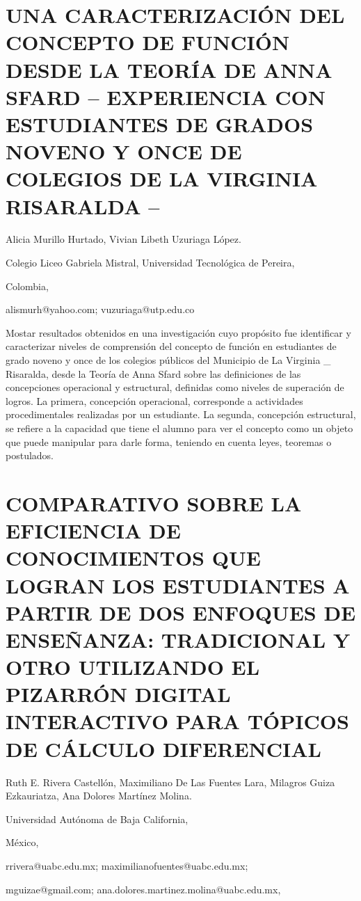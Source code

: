 \section{UNA CARACTERIZACIÓN DEL CONCEPTO DE FUNCIÓN DESDE LA TEORÍA DE ANNA
SFARD – EXPERIENCIA CON ESTUDIANTES DE GRADOS NOVENO Y ONCE DE COLEGIOS
DE LA VIRGINIA RISARALDA –}

\begin{datos}

Alicia Murillo Hurtado, Vivian Libeth Uzuriaga López.

Colegio Liceo Gabriela Mistral, Universidad Tecnológica de Pereira,

Colombia,

alismurh@yahoo.com; vuzuriaga@utp.edu.co 

\end{datos}

Mostar resultados obtenidos en una investigación cuyo propósito fue
identificar y caracterizar niveles de comprensión del concepto de
función en estudiantes de grado noveno y once de los colegios públicos
del Municipio de La Virginia \_ Risaralda, desde la Teoría de Anna
Sfard sobre las definiciones de las concepciones operacional y estructural,
definidas como niveles de superación de logros. La primera, concepción
operacional, corresponde a actividades procedimentales realizadas
por un estudiante. La segunda, concepción estructural, se refiere
a la capacidad que tiene el alumno para ver el concepto como un objeto
que puede manipular para darle forma, teniendo en cuenta leyes, teoremas
o postulados.


\section{COMPARATIVO SOBRE LA EFICIENCIA DE CONOCIMIENTOS QUE LOGRAN LOS ESTUDIANTES
A PARTIR DE DOS ENFOQUES DE ENSEÑANZA: TRADICIONAL Y OTRO UTILIZANDO
EL PIZARRÓN DIGITAL INTERACTIVO PARA TÓPICOS DE CÁLCULO DIFERENCIAL}

\begin{datos}

Ruth E. Rivera Castellón, Maximiliano De Las Fuentes Lara, Milagros
Guiza Ezkauriatza, Ana Dolores Martínez Molina.

Universidad Autónoma de Baja California,

México,

rrivera@uabc.edu.mx; maximilianofuentes@uabc.edu.mx;

mguizae@gmail.com; ana.dolores.martinez.molina@uabc.edu.mx, 

\end{datos}

